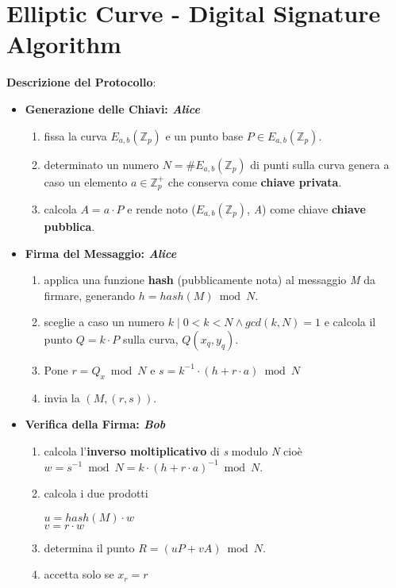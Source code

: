 \newpage
\section{Elliptic Curve - Digital Signature Algorithm}
\textbf{Descrizione del Protocollo}:
\begin{itemize}
    \item \textbf{Generazione delle Chiavi: \textit{Alice}}
    \begin{enumerate}
        \item fissa la curva $E_{a,b}(\mathbb{Z}_p)$ e un punto base $P \in E_{a,b}(\mathbb{Z}_p)$.
        \item determinato un numero $N = \#E_{a,b}(\mathbb{Z}_p)$ di punti sulla curva genera a caso un elemento $a \in \mathbb{Z}_p^+$ che conserva come \textbf{chiave privata}.
        \item calcola $A = a \cdot P$ e rende noto ($E_{a,b}(\mathbb{Z}_p)$, \textit{A}) come chiave \textbf{chiave pubblica}.
    \end{enumerate}
    \item \textbf{Firma del Messaggio: \textit{Alice}}
    \begin{enumerate}
        \item applica una funzione \textbf{hash} (pubblicamente nota) al messaggio \textit{M} da firmare, generando $h = hash(M) \bmod N$.
        \item sceglie a caso un numero $k \; | \; 0 < k < N \land gcd(k, N) = 1$ e calcola il punto $Q = k \cdot P$ sulla curva, $Q(x_q, y_q)$.
        \item Pone $r = Q_x \bmod N$ e $s = k^{-1} \cdot (h + r \cdot a) \bmod N$
        \item invia la $(M, (r, s))$.
    \end{enumerate}
    \item \textbf{Verifica della Firma: \textit{Bob}}
    \begin{enumerate}
        \item calcola l'\textbf{inverso moltiplicativo} di \textit{s} modulo \textit{N} cioè $w = s^{-1} \bmod N = k \cdot (h + r \cdot a)^{-1} \bmod N$.
        \item calcola i due prodotti
        \begin{center}
                $u = hash(M) \cdot w$ \\
                $v = r \cdot w$
        \end{center}
        \item determina il punto $R = (uP + vA) \bmod N$.
        \item accetta solo se $x_r = r$
    \end{enumerate}
\end{itemize}

